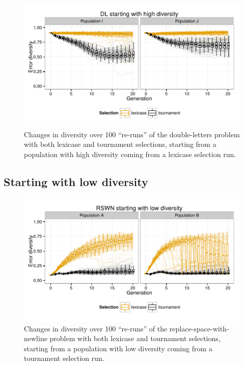 \documentclass{sig-alternate-05-2015}
\begin{document}
\begin{figure}
	\includegraphics{../figures/DL_high_diversity}
	\vspace{-1 cm}
	\caption{Changes in diversity over 100 ``re-runs'' of the double-letters problem with both lexicase and tournament selections, starting from a population with high diversity coming from a lexicase selection run.}
	\label{fig:DLhighDiversity}
\end{figure}

\subsection{Starting with low diversity}
\label{sec:lowDiversityResults}

\begin{figure}
	\includegraphics{../figures/RSWN_low_diversity}
	\vspace{-1 cm}
	\caption{Changes in diversity over 100 ``re-runs'' of the replace-space-with-newline problem with both lexicase and tournament selections, starting from a population with low diversity coming from a tournament selection run.}
	\label{fig:RSWNlowDiversity}
\end{figure}
\end{document}

